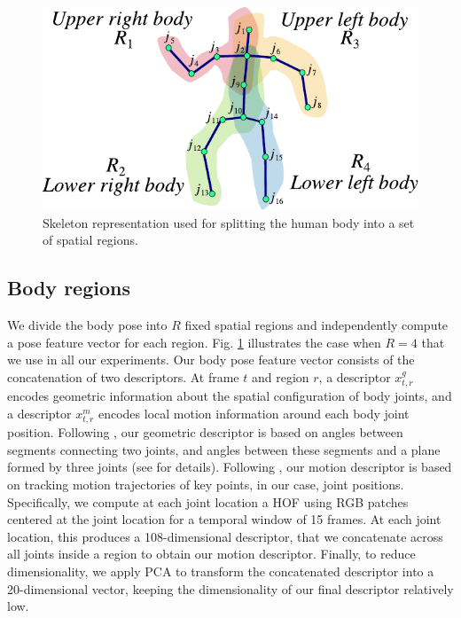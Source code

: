 \begin{figure}[tb]
\begin{center}
\includegraphics[width=0.8\linewidth]{./Fig/fig_joints_limbs_region.pdf}
\vspace{-2mm}
\end{center}
\caption{
\footnotesize
Skeleton representation used for splitting the human body into a set of 
spatial regions.}
\label{fig:skeleton_limbs_regions}
\vspace{-4mm}
\end{figure}

\subsection{Body regions}
We divide the body pose into $R$ fixed spatial regions and independently compute 
a pose feature vector for each region. Fig. \ref{fig:skeleton_limbs_regions} 
illustrates the case when $R = 4$ that we use in all our experiments. Our body 
pose feature vector consists of the concatenation of two descriptors. At frame 
$t$ and region $r$, a descriptor $x^{g}_{t,r}$ encodes geometric information 
about the spatial configuration of body joints, and a descriptor $x^{m}_{t,r}$ 
encodes local motion information around each body joint position. Following 
\cite{Lillo2014}, our geometric descriptor is based on angles between segments 
connecting two joints, and angles between these segments and a plane formed by 
three joints (see \cite{Lillo2014} for details). Following \cite{WangCVPR2011}, 
our motion descriptor is based on tracking motion trajectories of key points, in 
our case, joint positions. Specifically, we compute at each joint location a HOF 
using RGB patches centered at the joint location for a temporal window of 15 
frames. At each joint location, this produces a 108-dimensional descriptor,  
that we concatenate across all joints inside a region to obtain our motion descriptor. Finally, 
to reduce dimensionality, we apply PCA to transform the concatenated descriptor 
into a 20-dimensional vector, keeping the dimensionality of our final descriptor 
relatively low.


